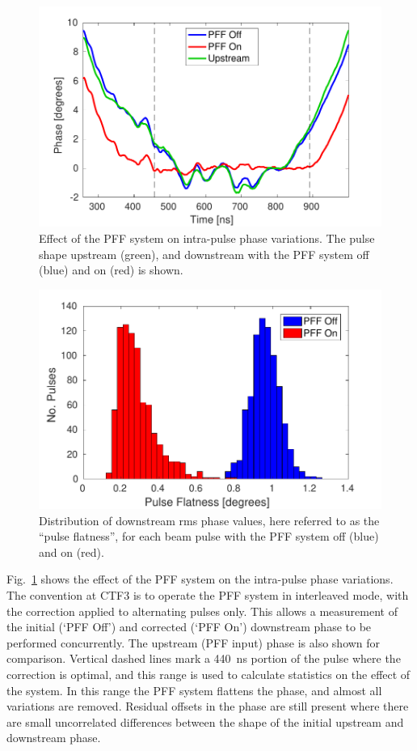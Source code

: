 \documentclass[%
 reprint,
 amsmath,amssymb,
 prl,
]{revtex4-1}
\begin{document}
\begin{figure}
	\includegraphics[width=\columnwidth]{figs/shape}%
	\caption{\label{fig:shape}Effect of the PFF system on intra-pulse phase 
		variations. The pulse shape upstream (green), and downstream with the 
		PFF 
		system off (blue) and on (red) is shown.}
\end{figure}

\begin{figure}
	\includegraphics[width=\columnwidth]{figs/flatness}%
	\caption{\label{fig:flatness}Distribution of downstream rms phase values, 
		here 
		referred to as the 
		``pulse flatness'', for each beam pulse with the PFF system off (blue) 
		and 
		on (red).}
\end{figure}

Fig.~\ref{fig:shape} shows the effect of the PFF system on the intra-pulse 
phase variations. The convention at CTF3 is to operate the PFF system in 
interleaved mode, with 
the correction applied to alternating pulses only. This allows a measurement of 
the initial (`PFF Off') and corrected (`PFF On') downstream phase to be 
performed concurrently. The upstream (PFF input) phase is also shown for 
comparison. Vertical dashed lines mark a 440~ns portion of the pulse where the 
correction is optimal, and this range is used to calculate statistics on the 
effect of the system. In this range the PFF system flattens the phase, 
and almost all variations are removed. Residual offsets in the phase are still 
present where there are small uncorrelated differences between the shape of the 
initial upstream and downstream phase.
\end{document}
